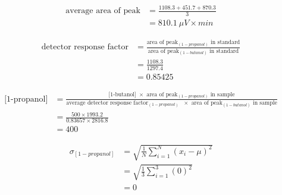 \documentclass{article}
\begin{document}
\begin{center}
\begin{align*}
    \text{average area of peak} &= \frac{1108.3 + 451.7 + 870.3}{3} \\
     &= 810.1 \ \mu V\times min
\end{align*}

\begin{align*}
    \text{detector response factor} &= \frac{\textrm{area of peak$_{(1-propanol)}$ in standard}}
    {\textrm{area of peak$_{(1-butanol)}$ in standard}} \\
     &= \frac{1108.3}{1297.4} \\
     &= 0.85425
\end{align*}

\begin{align*}
    \text{[1-propanol]} &= \frac{\textrm{[1-butanol] $\times$ area of
    peak$_{(1-propanol)}$ in sample}}
    {\textrm{average detector response factor$_{(1-propanol)}$ $\times$ area of
    peak$_{(1-butanol)}$ in sample}} \\
     &= \frac{500 \times 1993.2}{0.83657 \times 2816.8} \\
     &= 400
\end{align*}


\begin{align*}
    \sigma_{[1-propanol]} &= \sqrt{\frac{1}{N}\sum\limits_{i=1}^N (x_i - \mu)^2} \\
    &= \sqrt{\frac{1}{3} \sum\limits_{i=1}^3 (0)^2} \\
    &= 0
\end{align*}

\end{center}
\end{document}
